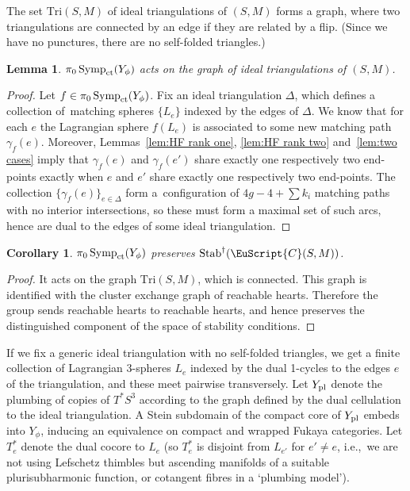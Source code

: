 \documentclass[pdftex]{sigma}
\newcommand{\scrC}{\EuScript{C}}
\DeclareMathOperator{\Symp}{Symp}
\newtheorem{lem}[thm]{Lemma}
\newtheorem{cor}[thm]{Corollary}
\theoremstyle{definition}
\numberwithin{equation}{section}
\begin{document}
The set $\mathrm{Tri}(S,M)$ of ideal triangulations of $(S,M)$ forms a graph, where two triangulations are connected by an edge if they are related by a flip. (Since we have no punctures, there are no self-folded triangles.)

\begin{lem}
$\pi_0\Symp_{\rm ct}(Y_{\phi})$ acts on the graph of ideal triangulations of $(S,M)$.
\end{lem}

\begin{proof}
Let $f \in \pi_0\Symp_{\rm ct}(Y_{\phi})$. Fix an ideal triangulation $\Delta$, which defines a collection of~matching spheres $\{L_e\}$ indexed by the edges of $\Delta$. We know that for each $e$ the Lagrangian sphere $f(L_e)$ is associated to some new matching path $\gamma_f(e)$. Moreover, Lemmas~\ref{lem:HF rank one}, \ref{lem:HF rank two} and~\ref{lem:two cases} imply that $\gamma_f(e)$ and $\gamma_f(e')$ share exactly one respectively two end-points exactly when $e$ and $e'$ share exactly one respectively two end-points. The collection $\{\gamma_f(e)\}_{e\in \Delta}$ form a~configuration of $4g-4+\sum k_i$ matching paths with no interior intersections, so these must form a maximal set of such arcs, hence are dual to the edges of some ideal trian\-gula\-tion.
\end{proof}

\begin{cor}
$\pi_0\Symp_{\rm ct}(Y_{\phi})$ preserves $\mathrm{Stab}^{\dagger}(\scrC(S,M))$.
\end{cor}

\begin{proof}
It acts on the graph $\mathrm{Tri}(S,M)$, which is connected. This graph is identified \cite{King-QiuYu} with the cluster exchange graph of reachable hearts. Therefore the group sends reachable hearts to reachable hearts, and hence preserves the distinguished component of the space of stability conditions.
\end{proof}


If we fix a generic ideal triangulation with no self-folded triangles, we get a finite collection of Lagrangian 3-spheres $L_e$ indexed by the dual 1-cycles to the edges $e$ of the triangulation, and these meet pairwise transversely. Let $Y_{\rm pl}$ denote the plumbing of copies of $T^*S^3$ according to the graph defined by the dual cellulation to the ideal triangulation. A Stein subdomain of the compact core of $Y_{\rm pl}$ embeds into $Y_{\phi}$, inducing an equivalence on compact and wrapped Fukaya categories. Let $T_e^*$ denote the dual cocore to $L_e$ (so $T_e^*$ is disjoint from $L_{e'}$ for $e' \neq e$, i.e.,~we are not using Lefschetz thimbles but ascending manifolds of a suitable plurisubharmonic function, or cotangent fibres in a `plumbing model').
\end{document}
